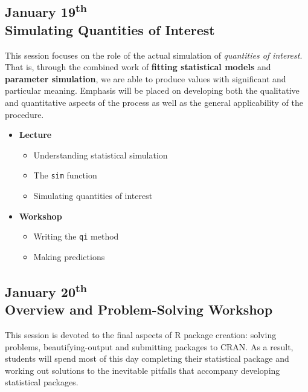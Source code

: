 \documentclass{article}
\begin{document}
\subsection{January 19\textsuperscript{th} \\ Simulating Quantities of Interest}

This session focuses on the role of the actual simulation of \emph{quantities of interest}.
That is, through the combined work of {\bf fitting statistical models} and {\bf parameter
simulation}, we are able to produce values with significant and particular meaning.
Emphasis will be placed on developing both the qualitative and quantitative aspects of the
process as well as the general applicability of the procedure.

\begin{itemize}

	\item {\bf Lecture}
		\begin{itemize}
		  \item Understanding statistical simulation
			\item The {\tt sim} function
			\item Simulating quantities of interest
		\end{itemize}
	
	\item {\bf Workshop}
		\begin{itemize}
			\item Writing the {\tt qi} method
		  \item Making predictions
		\end{itemize}

\end{itemize}



\subsection{January 20\textsuperscript{th} \\ Overview and Problem-Solving Workshop}

This session is devoted to the final aspects of R package creation: solving problems, 
beautifying-output and submitting packages to CRAN. As a result, students will spend most of this
day completing their statistical package and working out solutions to the inevitable pitfalls
that accompany developing statistical packages.
\end{document}
